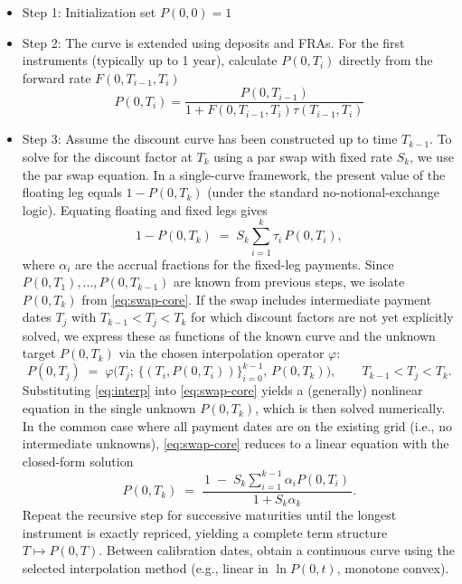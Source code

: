     \begin{itemize}
        \item Step 1: Initialization set $P(0,0) =1$
        \item Step 2: The curve is extended using deposits and FRAs. For the first instruments (typically up to 1 year), calculate $P(0,T_i)$ directly from the forward rate $F(0,T_{i-1},T_i)$
        \begin{equation} \label{eq:fraDF}
            P(0,T_i) = \frac{P(0,T_{i-1})}{1+F(0,T_{i-1},T_{i})\tau(T_{i-1},T_i)}
        \end{equation}
        \item Step 3: Assume the discount curve has been constructed up to time $T_{k-1}$.
        To solve for the discount factor at $T_k$ using a par swap with fixed rate $S_k$, we use the par swap equation. In a single-curve framework, the present value of the floating leg equals $1 - P(0,T_k)$ (under the standard no-notional-exchange logic). Equating floating and fixed legs gives
        \begin{equation}\label{eq:swap-core}
          1 - P(0,T_k)
          \;=\;
          S_k \sum_{i=1}^{k} \tau_i \, P(0,T_i),
        \end{equation}
        where $\alpha_i$ are the accrual fractions for the fixed-leg payments. Since $P(0,T_1),\dots,P(0,T_{k-1})$ are known from previous steps, we isolate $P(0,T_k)$ from \eqref{eq:swap-core}. If the swap includes intermediate payment dates $T_j$ with $T_{k-1} < T_j < T_k$ for which discount factors are not yet explicitly solved, we express these as functions of the known curve and the unknown target $P(0,T_k)$ via the chosen interpolation operator $\varphi$:
        \begin{equation}\label{eq:interp}
          P(0,T_j) \;=\; \varphi\!\big( T_j;\, \{(T_i,P(0,T_i))\}_{i=0}^{k-1},\, P(0,T_k) \big),
          \qquad T_{k-1} < T_j < T_k.
        \end{equation}
        Substituting \eqref{eq:interp} into \eqref{eq:swap-core} yields a (generally) nonlinear equation in the single unknown $P(0,T_k)$, which is then solved numerically. In the common case where all payment dates are on the existing grid (i.e., no intermediate unknowns), \eqref{eq:swap-core} reduces to a linear equation with the closed-form solution
        \begin{equation}\label{eq:swap-closed-form}
          P(0,T_k)
          \;=\;
          \frac{\,1 \;-\; S_k \displaystyle\sum_{i=1}^{k-1} \alpha_i P(0,T_i)\,}
               {\,1 + S_k \alpha_k\,}.
        \end{equation}
        \noindent 
        Repeat the recursive step for successive maturities until the longest instrument is exactly repriced, yielding a complete term structure $T \mapsto P(0,T)$. Between calibration dates, obtain a continuous curve using the selected interpolation method (e.g., linear in $\ln P(0,t)$, monotone convex).
    \end{itemize}

